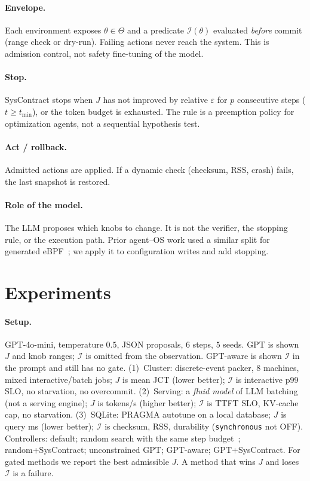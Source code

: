 \documentclass{article}
\begin{document}
\paragraph{Envelope.}
Each environment exposes $\theta\in\Theta$ and a predicate $\mathcal{I}(\theta)$ evaluated \emph{before} commit (range check or dry-run).
Failing actions never reach the system.
This is admission control, not safety fine-tuning of the model.

\paragraph{Stop.}
SysContract stops when $J$ has not improved by relative $\varepsilon$ for $p$ consecutive steps ($t\ge t_{\min}$), or the token budget is exhausted.
The rule is a preemption policy for optimization agents, not a sequential hypothesis test.

\paragraph{Act / rollback.}
Admitted actions are applied.
If a dynamic check (checksum, RSS, crash) fails, the last snapshot is restored.

\paragraph{Role of the model.}
The LLM proposes which knobs to change.
It is not the verifier, the stopping rule, or the execution path.
Prior agent--OS work used a similar split for generated eBPF~\cite{zheng2025schedcp}; we apply it to configuration writes and add stopping.

\section{Experiments}

\paragraph{Setup.}
GPT-4o-mini, temperature $0.5$, JSON proposals, $6$ steps, $5$ seeds.
GPT is shown $J$ and knob ranges; $\mathcal{I}$ is omitted from the observation.
GPT-aware is shown $\mathcal{I}$ in the prompt and still has no gate.
(1)~Cluster: discrete-event packer, $8$ machines, mixed interactive/batch jobs; $J$ is mean JCT (lower better); $\mathcal{I}$ is interactive p99 SLO, no starvation, no overcommit.
(2)~Serving: a \emph{fluid model} of LLM batching (not a serving engine); $J$ is tokens/s (higher better); $\mathcal{I}$ is TTFT SLO, KV-cache cap, no starvation.
(3)~SQLite: PRAGMA autotune on a local database; $J$ is query ms (lower better); $\mathcal{I}$ is checksum, RSS, durability (\texttt{synchronous} not OFF).
Controllers: default; random search with the same step budget~\cite{ansel2014opentuner}; random+SysContract; unconstrained GPT; GPT-aware; GPT+SysContract.
For gated methods we report the best admissible $J$.
A method that wins $J$ and loses $\mathcal{I}$ is a failure.
\end{document}
